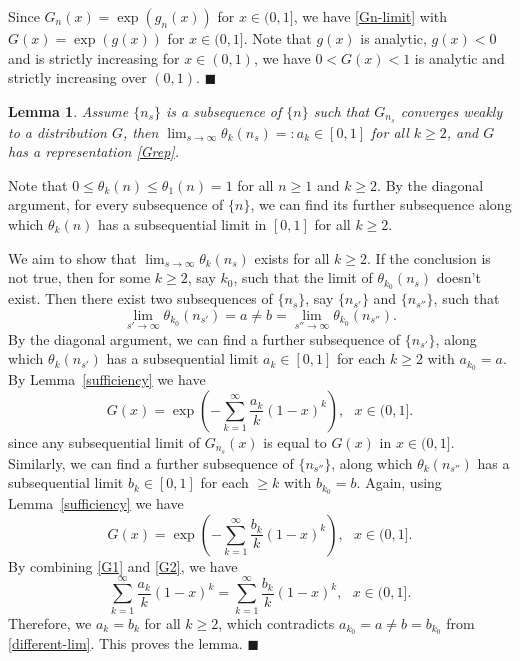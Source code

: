 \documentclass[11pt]{article}
\newtheorem{lemma}{\textbf{Lemma}}[section]
\numberwithin{equation}{section}
\begin{document}
Since $G_n(x)=\exp(g_n(x))$ for $x\in (0,1]$, we have
\eqref{Gn-limit} with $G(x)=\exp(g(x))$ for $x\in (0,1]$. Note that
$g(x)$ is analytic,  $g(x)<0$ and is strictly increasing for $x\in
(0,1)$, we have $0<G(x)<1$ is analytic and strictly increasing over
$(0,1)$.
 \hfill$\blacksquare$


\begin{lemma}\label{necessity}
Assume $\{n_s\}$ is a subsequence of $\{n\}$ such that  $G_{n_s}$
converges weakly to a distribution $G$, then
$\lim_{s\to\infty}\theta_k(n_s)=:a_k\in[0,1]$ for all $k\ge 2$, and
$G$ has a representation \eqref{Grep}.
\end{lemma}

 Note that $0\leq \theta_k(n)\leq\theta_1(n)=1$
for all $n\ge 1$ and $k\geq 2$. By the diagonal argument, for every
subsequence of $\{n\}$, we can find its further subsequence along
which $\theta_k(n)$ has a subsequential limit in $[0,1]$ for all
$k\ge 2$.

We aim to show that $\lim_{s\to\infty}\theta_k(n_s)$ exists for all
$k\ge 2$. If the conclusion is not true, then for some $k\ge 2$, say
$k_0$, such that the limit of $\theta_{k_0}(n_s)$ doesn't exist.
Then there exist two subsequences of $\{n_s\}$, say $\{n_{s'}\}$ and
$\{n_{s''}\}$, such that
\begin{equation}\label{different-lim}
\lim_{s'\to\infty}\theta_{k_0}(n_{s'})=a \ne
b=\lim_{s''\to\infty}\theta_{k_0}(n_{s''}).
\end{equation}
By the diagonal argument, we can find a further subsequence of
$\{n_{s'}\}$, along which $\theta_k(n_{s'})$ has a subsequential
limit $a_k\in [0,1]$ for each $k\ge 2$ with $a_{k_0}=a$. By
Lemma~\ref{sufficiency} we have
\begin{equation}\label{G1}
G(x)=\exp(-\sum^\infty_{k=1}\frac{a_k}{k}(1-x)^k), ~~~x\in (0,1].
\end{equation}
since any subsequential limit of $G_{n_s}(x)$ is equal to $G(x)$ in
$x\in (0,1]$. Similarly,  we can find a further subsequence of
$\{n_{s''}\}$, along which $\theta_k(n_{s''})$ has a subsequential
limit $b_k\in [0,1]$ for each $\ge k$ with $b_{k_0}=b$. Again, using
Lemma~\ref{sufficiency} we have
\begin{equation}\label{G2}
G(x)=\exp(-\sum^\infty_{k=1}\frac{b_k}{k}(1-x)^k), ~~~x\in (0,1].
\end{equation}
By combining \eqref{G1} and \eqref{G2}, we have
\[
\sum^\infty_{k=1}\frac{a_k}{k}(1-x)^k=\sum^\infty_{k=1}\frac{b_k}{k}(1-x)^k,~~~x\in
(0,1].
\]
Therefore, we $a_k=b_k$ for all $k\geq 2$, which contradicts
$a_{k_0}=a\ne b= b_{k_0}$ from \eqref{different-lim}. This proves
the lemma. \hfill$\blacksquare$
\end{document}
